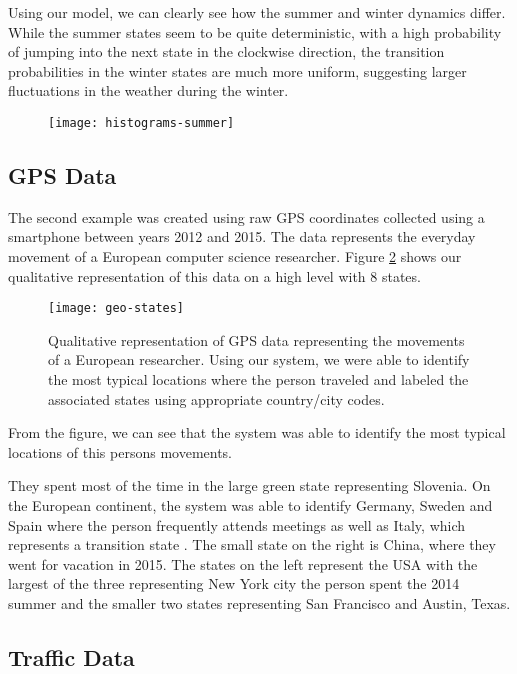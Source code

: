 Using our model, we can clearly see how the summer and winter dynamics differ. While the summer states seem to be quite deterministic, with a high probability of jumping into the next state in the clockwise direction, the transition probabilities in the winter states are much more uniform, suggesting larger fluctuations in the weather during the winter.

\begin{figure}[h!]
	\centering
	\texttt{[image: histograms-summer]}
	\caption{ }
	\label{fig:histograms-summer}
\end{figure}

\subsection{GPS Data}

The second example was created using raw GPS coordinates collected using a smartphone between years 2012 and 2015.
The data represents the everyday movement of a European computer science researcher. Figure \ref{fig:example-geo}
shows our qualitative representation of this data on a high level with 8 states.

\begin{figure}[h!]
	\centering
	\texttt{[image: geo-states]}
	\caption{Qualitative representation of GPS data representing the movements of a European researcher. Using our system, we were able to identify the most typical locations where the person traveled and labeled the associated states using appropriate country/city codes.}
	\label{fig:example-geo}
\end{figure}

From the figure, we can see that the system was able to identify the most typical locations of this persons
movements.

They spent most of the time in the large green state representing Slovenia. On the European continent, the system was able to identify Germany, Sweden and Spain where the person frequently attends meetings as well as Italy, which represents a transition state . The small state on the right is China, where they went for vacation in 2015. The states on the left represent the USA with the largest of the three representing New York city the person spent the 2014 summer and the smaller two states representing San Francisco and Austin, Texas.

\subsection{Traffic Data}

